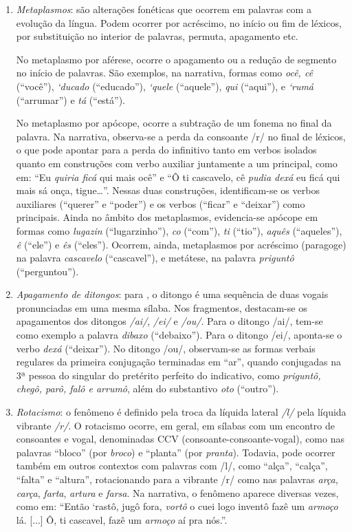 \documentclass[portuguese]{textolivre}
\begin{document}
\begin{enumerate}[label=\alph*.]
    \item \textit{Metaplasmos}: são alterações fonéticas que ocorrem em palavras com a evolução da língua. Podem ocorrer por acréscimo, no início ou fim de léxicos, por substituição no interior de palavras, permuta, apagamento etc.
    
    No metaplasmo por aférese, ocorre o apagamento ou a redução de segmento no início de palavras. São exemplos, na narrativa, formas como \textit{ocê, cê} (“você”), \textit{‘ducado} (“educado”), \textit{‘quele} (“aquele”), \textit{qui} (“aqui”), e \textit{‘rumá} (“arrumar”) e \textit{tá} (“está”).
    
    No metaplasmo por apócope, ocorre a subtração de um fonema no final da palavra. Na narrativa, observa-se a perda da consoante /r/ no final de léxicos, o que pode apontar para a perda do infinitivo tanto em verbos isolados quanto em construções com verbo auxiliar juntamente a um principal, como em: “Eu \textit{quiria ficá} qui mais ocê” e “Ô ti cascavelo, cê \textit{pudia dexá} eu ficá qui mais sá onça, tigue…”. Nessas duas construções, identificam-se os verbos auxiliares (“querer” e “poder”) e os verbos (“ficar” e “deixar”) como principais. Ainda no âmbito dos metaplasmos, evidencia-se apócope em formas como \textit{lugazin} (“lugarzinho”), \textit{co} (“com”), \textit{ti} (“tio”), \textit{aquês} (“aqueles”), \textit{ê} (“ele”) e \textit{ês} (“eles”). Ocorrem, ainda, metaplasmos por acréscimo (paragoge) na palavra \textit{cascavelo} (“cascavel”), e metátese, na palavra \textit{priguntô} (“perguntou”).
    \item \textit{Apagamento de ditongos}: para \textcite [p. 101]{MattosoCamaraJr1978}, o ditongo é uma sequência de duas vogais pronunciadas em uma mesma sílaba. Nos fragmentos, destacam-se os apagamentos dos ditongos \textit{/ai/}, \textit{/ei/} e \textit{/ou/}. Para o ditongo /ai/, tem-se como exemplo a palavra \textit{dibaxo} (“debaixo”). Para o ditongo /ei/, aponta-se o verbo \textit{dexá} (“deixar”). No ditongo /ou/, observam-se as formas verbais regulares da primeira conjugação terminadas em “ar”, quando conjugadas na 3ª pessoa do singular do pretérito perfeito do indicativo, como \textit{priguntô, chegô, parô, falô e arrumô}, além do substantivo \textit{oto} (“outro”).
    \item \textit{Rotacismo}: o fenômeno é definido pela troca da líquida lateral \textit{/l/} pela líquida vibrante \textit{/r/}. O rotacismo ocorre, em geral, em sílabas com um encontro de consoantes e vogal, denominadas CCV (consoante-consoante-vogal), como nas palavras “bloco” (por \textit{broco}) e “planta” (por \textit{pranta}). Todavia, pode ocorrer também em outros contextos com palavras com /l/, como “alça”, “calça”, “falta” e “altura”, rotacionando para a vibrante /r/ como nas palavras \textit{arça}, \textit{carça}, \textit{farta}, \textit{artura} e \textit{farsa}. Na narrativa, o fenômeno aparece diversas vezes, como em: “Então ‘rastô, jugô fora, \textit{vortô} o cuei logo inventô fazê um \textit{armoço} lá. [...] Ô, ti cascavel, fazê um \textit{armoço} aí pra nós.”.

\end{enumerate}
\end{document}

